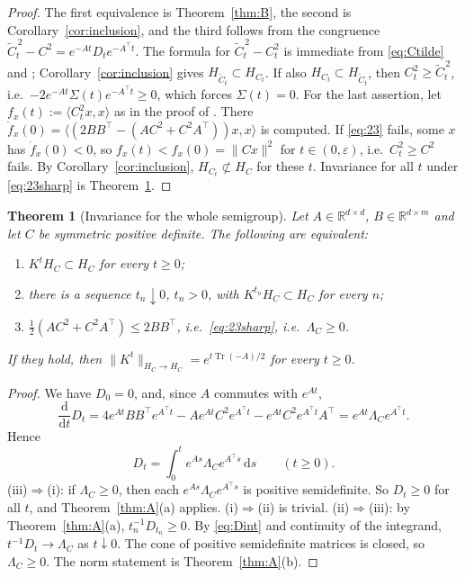 \documentclass[11pt]{article}
\newtheorem{theorem}{Theorem}
\theoremstyle{definition}
\theoremstyle{remark}
\newcommand{\R}{\mathbb{R}}
\newcommand{\Tr}{\operatorname{Tr}}
\newcommand{\dd}{\,\mathrm{d}}
\newcommand{\Ct}{\widetilde{C}_t}
\newcommand{\ip}[2]{\langle #1,#2\rangle}
\newcommand{\tp}{\top}
\begin{document}
\begin{proof}
The first equivalence is Theorem~\ref{thm:B}, the second is Corollary~\ref{cor:inclusion}, and the third follows from
the congruence $\Ct^{\,2}-C^2=e^{-At}D_te^{-A^\tp t}$. The formula for $\Ct^{\,2}-C_t^2$ is immediate from
\eqref{eq:Ctilde} and \cite[(4.1)]{PSWPN}; Corollary~\ref{cor:inclusion} gives $H_{\Ct}\subset H_{C_t}$. If also
$H_{C_t}\subset H_{\Ct}$, then $C_t^2\ge\Ct^{\,2}$, i.e.\ $-2e^{-At}\Sigma(t)e^{-A^\tp t}\ge0$, which forces $\Sigma(t)=0$.
For the last assertion, let $f_x(t):=\ip{C_t^2x}x$ as in the proof of \cite[Theorem~2.1]{PSWPN}. There
$\dot f_x(0)=\ip{(2BB^\tp-(AC^2+C^2A^\tp))x}x$ is computed. If \eqref{eq:23} fails, some $x$ has $\dot f_x(0)<0$, so
$f_x(t)<f_x(0)=\|Cx\|^2$ for $t\in(0,\varepsilon)$, i.e.\ $C_t^2\ge C^2$ fails. By Corollary~\ref{cor:inclusion}, $H_{C_t}\not\subset H_C$
for these $t$. Invariance for all $t$ under \eqref{eq:23sharp} is Theorem~\ref{thm:C}.
\end{proof}

\begin{theorem}[Invariance for the whole semigroup]\label{thm:C}
Let $A\in\R^{d\times d}$, $B\in\R^{d\times m}$ and let $C$ be symmetric positive definite. The following are equivalent:
\begin{enumerate}
\item[(i)] $K^tH_C\subset H_C$ for every $t\ge0$;
\item[(ii)] there is a sequence $t_n\downarrow0$, $t_n>0$, with $K^{t_n}H_C\subset H_C$ for every $n$;
\item[(iii)] $\tfrac12(AC^2+C^2A^\tp)\le2BB^\tp$, i.e.\ \eqref{eq:23sharp}, i.e.\ $\Lambda_C\ge0$.
\end{enumerate}
If they hold, then $\|K^t\|_{H_C\to H_C}=e^{t\Tr(-A)/2}$ for every $t\ge0$.
\end{theorem}

\begin{proof}
We have $D_0=0$, and, since $A$ commutes with $e^{At}$,
\[
\frac{\mathrm d}{\mathrm dt}D_t=4e^{At}BB^\tp e^{A^\tp t}-Ae^{At}C^2e^{A^\tp t}-e^{At}C^2e^{A^\tp t}A^\tp=e^{At}\Lambda_Ce^{A^\tp t}.
\]
Hence
\begin{equation}\label{eq:Dint}
D_t=\int_0^te^{As}\Lambda_Ce^{A^\tp s}\dd s\qquad(t\ge0).
\end{equation}
(iii)$\Rightarrow$(i): if $\Lambda_C\ge0$, then each $e^{As}\Lambda_Ce^{A^\tp s}$ is positive semidefinite. So $D_t\ge0$
for all $t$, and Theorem~\ref{thm:A}(a) applies. (i)$\Rightarrow$(ii) is trivial. (ii)$\Rightarrow$(iii): by
Theorem~\ref{thm:A}(a), $t_n^{-1}D_{t_n}\ge0$. By \eqref{eq:Dint} and continuity of the integrand,
$t^{-1}D_t\to\Lambda_C$ as $t\downarrow0$. The cone of positive semidefinite matrices is closed, so $\Lambda_C\ge0$. The norm
statement is Theorem~\ref{thm:A}(b).
\end{proof}
\end{document}
